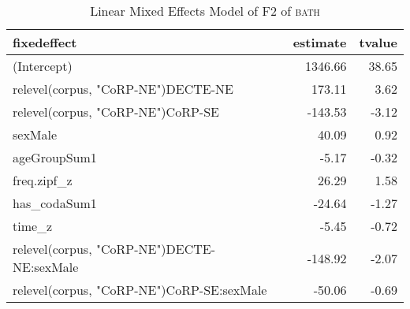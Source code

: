 \begin{table}[ht]
\centering
\begin{tabular}{lrr}
  \hline
fixedeffect & estimate & tvalue \\ 
  \hline
(Intercept) & 1346.66 & 38.65 \\ 
  relevel(corpus, "CoRP-NE")DECTE-NE & 173.11 & 3.62 \\ 
  relevel(corpus, "CoRP-NE")CoRP-SE & -143.53 & -3.12 \\ 
  sexMale & 40.09 & 0.92 \\ 
  ageGroupSum1 & -5.17 & -0.32 \\ 
  freq.zipf\_z & 26.29 & 1.58 \\ 
  has\_codaSum1 & -24.64 & -1.27 \\ 
  time\_z & -5.45 & -0.72 \\ 
  relevel(corpus, "CoRP-NE")DECTE-NE:sexMale & -148.92 & -2.07 \\ 
  relevel(corpus, "CoRP-NE")CoRP-SE:sexMale & -50.06 & -0.69 \\ 
   \hline
\end{tabular}
\caption{Linear Mixed Effects Model of F2 of \textsc{bath} \label{tbl:BF2}} 
\end{table}
